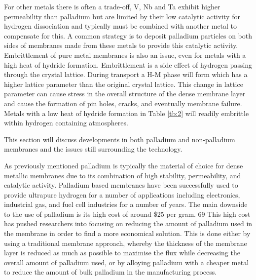 For other metals there is often a trade-off, V, Nb and Ta exhibit higher permeability than 
palladium but are limited by their low catalytic activity for hydrogen dissociation and 
typically must be combined with another metal to compensate for this. A common strategy is 
to deposit palladium particles on both sides of membranes made from these metals to provide 
this catalytic activity. Embrittlement of pure metal membranes is also an issue, even for 
metals with a high heat of hydride formation. Embrittlement is a side effect of hydrogen 
passing through the crystal lattice. During transport a H-M phase will form which has a 
higher lattice parameter than the original crystal lattice. This change in lattice parameter 
can cause stress in the overall structure of the dense membrane layer and cause the formation 
of pin holes, cracks, and eventually membrane failure. Metals with a low heat of hydride 
formation in Table \ref{tb:2} will readily embrittle within hydrogen containing atmospheres.

This section will discuss developments in both palladium and non-palladium membranes and the 
issues still surrounding the technology.

As previously mentioned palladium is typically the material of choice for dense metallic 
membranes due to its combination of high stability, permeability, and catalytic activity. 
Palladium based membranes have been successfully used to provide ultrapure hydrogen for a 
number of applications including electronics, industrial gas, and fuel cell industries for a 
number of years. The main downside to the use of palladium is its high cost of around \$25 
per gram. 69 This high cost has pushed researchers into focusing on reducing the amount of 
palladium used in the membrane in order to find a more economical solution. This is done 
either by using a traditional membrane approach, whereby the thickness of the membrane layer 
is reduced as much as possible to maximise the flux while decreasing the overall amount of 
palladium used, or by alloying palladium with a cheaper metal to reduce the amount of bulk 
palladium in the manufacturing process. 

